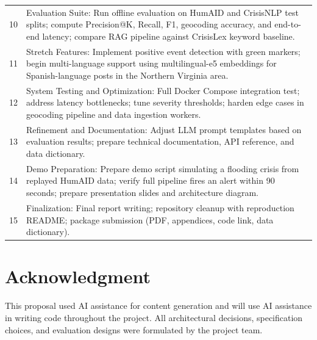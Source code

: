\documentclass[conference]{IEEEtran}
\begin{document}
\begin{table}[h]
\begin{tabular}{p{0.8cm} p{6.6cm}}
10 & Evaluation Suite: Run offline evaluation on HumAID and CrisisNLP test splits;
compute Precision@K, Recall, F1, geocoding accuracy, and end-to-end latency;
compare RAG pipeline against CrisisLex keyword baseline. \\
11 & Stretch Features: Implement positive event detection with green markers;
begin multi-language support using multilingual-e5 embeddings for
Spanish-language posts in the Northern Virginia area. \\
12 & System Testing and Optimization: Full Docker Compose integration test; address
latency bottlenecks; tune severity thresholds; harden edge cases in
geocoding pipeline and data ingestion workers. \\
13 & Refinement and Documentation: Adjust LLM prompt templates based on evaluation
results; prepare technical documentation, API reference, and data dictionary. \\
14 & Demo Preparation: Prepare demo script simulating a flooding crisis from
replayed HumAID data; verify full pipeline fires an alert within 90 seconds;
prepare presentation slides and architecture diagram. \\
15 & Finalization: Final report writing; repository cleanup with reproduction README;
package submission (PDF, appendices, code link, data dictionary). \\
\bottomrule
\end{tabular}
\end{table}

\section{Acknowledgment}

This proposal used AI assistance for content generation and will use AI
assistance in writing code throughout the project. All architectural decisions,
specification choices, and evaluation designs were formulated by the project
team.
\end{document}
